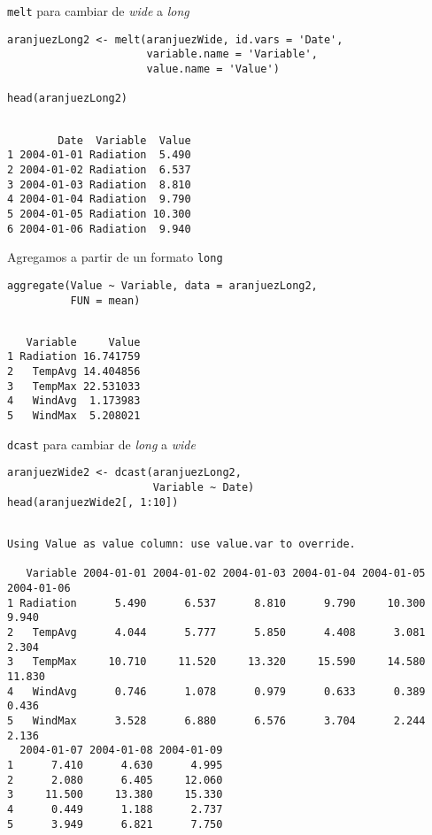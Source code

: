\documentclass[aspectratio=169, usenames,svgnames,dvipsnames]{beamer}
\begin{document}
\begin{frame}[label={sec:org39caf1d},fragile]{\texttt{melt} para cambiar de \emph{wide} a \emph{long}}
 \lstset{language=r,label= ,caption= ,captionpos=b,numbers=none}
\begin{lstlisting}
aranjuezLong2 <- melt(aranjuezWide, id.vars = 'Date',
                      variable.name = 'Variable',
                      value.name = 'Value')

head(aranjuezLong2)
\end{lstlisting}

\begin{verbatim}

        Date  Variable  Value
1 2004-01-01 Radiation  5.490
2 2004-01-02 Radiation  6.537
3 2004-01-03 Radiation  8.810
4 2004-01-04 Radiation  9.790
5 2004-01-05 Radiation 10.300
6 2004-01-06 Radiation  9.940
\end{verbatim}
\end{frame}

\begin{frame}[label={sec:org0b22ea1},fragile]{Agregamos a partir de un formato \texttt{long}}
 \lstset{language=r,label= ,caption= ,captionpos=b,numbers=none}
\begin{lstlisting}
aggregate(Value ~ Variable, data = aranjuezLong2,
          FUN = mean)
\end{lstlisting}

\begin{verbatim}

   Variable     Value
1 Radiation 16.741759
2   TempAvg 14.404856
3   TempMax 22.531033
4   WindAvg  1.173983
5   WindMax  5.208021
\end{verbatim}
\end{frame}

\begin{frame}[label={sec:org44498a5},fragile]{\texttt{dcast} para cambiar de \emph{long} a \emph{wide}}
 \lstset{language=r,label= ,caption= ,captionpos=b,numbers=none}
\begin{lstlisting}
aranjuezWide2 <- dcast(aranjuezLong2,
                       Variable ~ Date)
head(aranjuezWide2[, 1:10])
\end{lstlisting}

\begin{verbatim}

Using Value as value column: use value.var to override.

   Variable 2004-01-01 2004-01-02 2004-01-03 2004-01-04 2004-01-05 2004-01-06
1 Radiation      5.490      6.537      8.810      9.790     10.300      9.940
2   TempAvg      4.044      5.777      5.850      4.408      3.081      2.304
3   TempMax     10.710     11.520     13.320     15.590     14.580     11.830
4   WindAvg      0.746      1.078      0.979      0.633      0.389      0.436
5   WindMax      3.528      6.880      6.576      3.704      2.244      2.136
  2004-01-07 2004-01-08 2004-01-09
1      7.410      4.630      4.995
2      2.080      6.405     12.060
3     11.500     13.380     15.330
4      0.449      1.188      2.737
5      3.949      6.821      7.750
\end{verbatim}
\end{frame}
\end{document}
